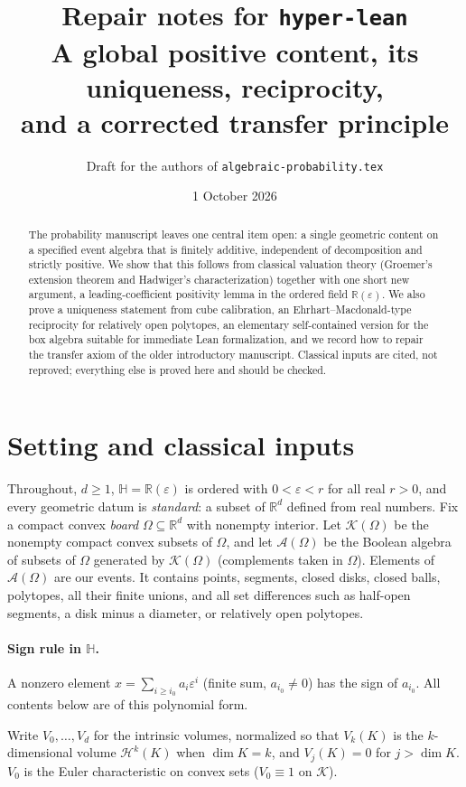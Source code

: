 \documentclass[11pt]{article}
\title{Repair notes for \texttt{hyper-lean}\\
\large A global positive content, its uniqueness, reciprocity,\\ and a corrected transfer principle}
\author{Draft for the authors of \texttt{algebraic-probability.tex}}
\date{1 October 2026}
\theoremstyle{definition}
\theoremstyle{remark}
\newcommand{\R}{\mathbb R}
\newcommand{\eps}{\varepsilon}
\newcommand{\HH}{\mathbb H}
\newcommand{\KK}{\mathcal K}
\newcommand{\A}{\mathcal A}
\newcommand{\Hk}{\mathcal H}
\begin{document}
\maketitle

\begin{abstract}
The probability manuscript leaves one central item open: a single
geometric content on a specified event algebra that is finitely additive,
independent of decomposition and strictly positive. We show that this
follows from classical valuation theory (Groemer's extension theorem and
Hadwiger's characterization) together with one short new argument, a
leading-coefficient positivity lemma in the ordered field $\R(\eps)$.
We also prove a uniqueness statement from cube calibration, an
Ehrhart--Macdonald-type reciprocity for relatively open polytopes, an
elementary self-contained version for the box algebra suitable for
immediate Lean formalization, and we record how to repair the transfer
axiom of the older introductory manuscript. Classical inputs are cited,
not reproved; everything else is proved here and should be checked.
\end{abstract}

\section{Setting and classical inputs}
Throughout, $d\geq1$, $\HH=\R(\eps)$ is ordered with $0<\eps<r$ for all
real $r>0$, and every geometric datum is \emph{standard}: a subset of
$\R^d$ defined from real numbers. Fix a compact convex \emph{board}
$\Omega\subseteq\R^d$ with nonempty interior. Let $\KK(\Omega)$ be the
nonempty compact convex subsets of $\Omega$, and let $\A(\Omega)$ be the
Boolean algebra of subsets of $\Omega$ generated by $\KK(\Omega)$
(complements taken in $\Omega$). Elements of $\A(\Omega)$ are our events.
It contains points, segments, closed disks, closed balls, polytopes, all
their finite unions, and all set differences such as half-open segments,
a disk minus a diameter, or relatively open polytopes.

\paragraph{Sign rule in $\HH$.} A nonzero element
$x=\sum_{i\geq i_0}a_i\eps^i$ (finite sum, $a_{i_0}\neq0$) has the sign of
$a_{i_0}$. All contents below are of this polynomial form.

Write $V_0,\dots,V_d$ for the intrinsic volumes, normalized so that
$V_k(K)$ is the $k$-dimensional volume $\Hk^k(K)$ when $\dim K=k$, and
$V_j(K)=0$ for $j>\dim K$. $V_0$ is the Euler characteristic on convex
sets ($V_0\equiv1$ on $\KK$).
\end{document}
